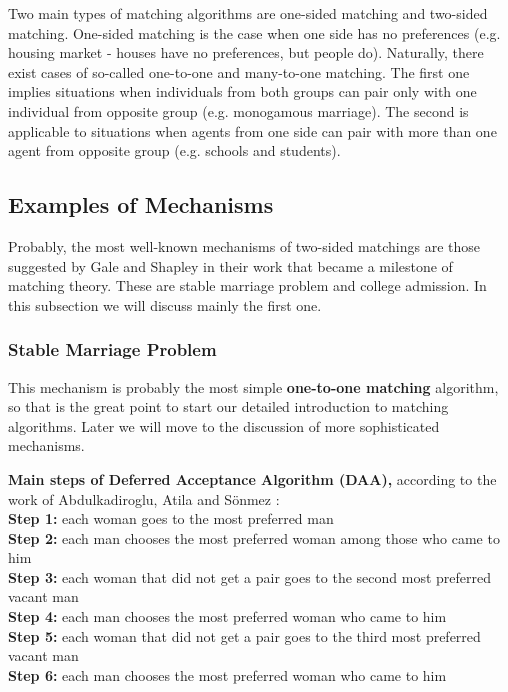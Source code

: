 \documentclass[a4paper]{article} %
\begin{document}
\hfill 
\break
Two main types of matching algorithms are one-sided matching and two-sided matching.
One-sided matching is the case when one side has no preferences (e.g. housing market - houses have no preferences, but people do). 
Naturally, there exist cases of so-called one-to-one and many-to-one matching.
The first one implies situations when individuals from both groups can pair only with one individual from opposite group (e.g. monogamous marriage). The second is applicable to situations when agents from one side can pair with more than one agent from opposite group (e.g. schools and students).







\subsection{Examples of Mechanisms}

Probably, the most well-known mechanisms of two-sided matchings are those suggested by Gale and Shapley in their work \cite{MilestoneWork} that became a milestone of matching theory. These are stable marriage problem and college admission. In this subsection we will discuss mainly the first one. 


\subsubsection{Stable Marriage Problem}
This mechanism is probably the most simple \textbf{one-to-one matching} algorithm, so that is the great point to start our detailed introduction to matching algorithms. Later we will move to the discussion of more sophisticated mechanisms.

\hfill 
\break
\textbf{Main steps of Deferred Acceptance Algorithm (DAA),} according to the work of Abdulkadiroglu, Atila and Sönmez \cite{MainSource}:\\
\textbf{Step 1:} each woman goes to the most preferred man\\
\textbf{Step 2:} each man chooses the most preferred woman among those who came to him\\
\textbf{Step 3:} each woman that did not get a pair goes to the second most preferred vacant man\\
\textbf{Step 4:} each man chooses the most preferred woman who came to him\\
\textbf{Step 5:} each woman that did not get a pair goes to the third most preferred vacant man\\
\textbf{Step 6:} each man chooses the most preferred woman who came to him
\end{document}
